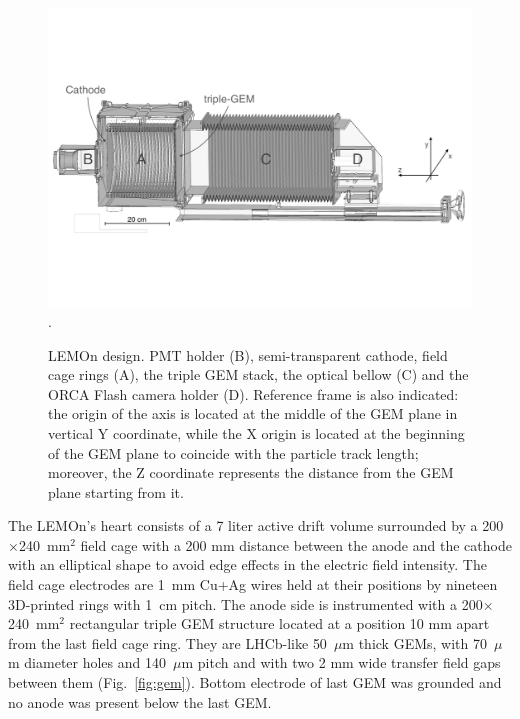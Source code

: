 \documentclass[review]{elsarticle}
\begin{document}
\begin{figure}[!ht]
\centering
\includegraphics[scale=0.4]{Fig2-lemon.pdf}\DeclareGraphicsExtensions.
\caption{LEMOn design. PMT holder (B), semi-transparent cathode, field cage rings (A),  the triple GEM stack, the optical bellow (C) and the  ORCA Flash camera holder (D).
Reference frame is also indicated: the origin of the axis is located at the middle of the GEM plane in vertical Y coordinate, while the X origin is located at the beginning of the GEM plane to coincide with the particle track length; moreover, the Z coordinate represents the distance from the GEM plane starting from it.}
\label{fig:sex}
\end{figure}

The LEMOn's heart consists of a 7 liter active drift volume surrounded by a  200$\times$240~mm$^2$  field cage with a 200 mm distance between the anode and the cathode with an elliptical shape to avoid edge effects in the electric field intensity. The  field cage electrodes are   1~mm Cu+Ag wires held at their positions  by nineteen 3D-printed rings with 1~cm pitch. The anode side is instrumented with a 200$\times$240~mm$^2$ rectangular triple  GEM structure located at a position 10 mm apart from the last field cage ring. They are LHCb-like \cite{bib:thesis}   50~$\mu$m thick GEMs, with 70~$\mu$m diameter holes and 140~$\mu$m pitch   and  with two 2 mm wide  transfer  field gaps between them (Fig.~\ref{fig:gem}). Bottom electrode of last GEM was grounded and no anode was present below the last GEM.
\end{document}
